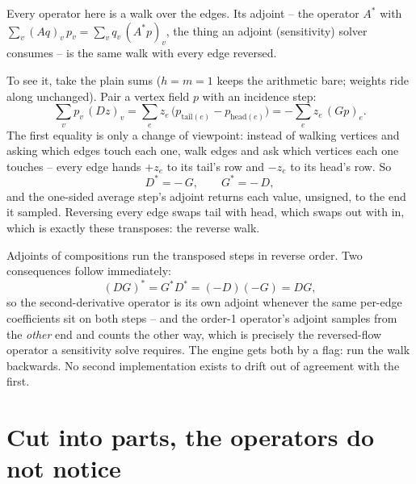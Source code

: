 \documentclass[11pt]{article}
\begin{document}
Every operator here is a walk over the edges. Its adjoint -- the
operator $A^{\!*}$ with
$\sum_v (Aq)_v\,p_v = \sum_v q_v\,(A^{\!*}p)_v$, the thing an
adjoint (sensitivity) solver consumes -- is the same walk with every
edge reversed.

\begin{center}
\end{center}

To see it, take the plain sums ($h = m = 1$ keeps the arithmetic
bare; weights ride along unchanged). Pair a vertex field $p$ with an
incidence step:
\[
\sum_v p_v\,(Dz)_v
 = \sum_e z_e\,\bigl(p_{\text{tail}(e)} - p_{\text{head}(e)}\bigr)
 = -\sum_e z_e\,(Gp)_e .
\]
The first equality is only a change of viewpoint: instead of walking
vertices and asking which edges touch each one, walk edges and ask
which vertices each one touches -- every edge hands $+z_e$ to its
tail's row and $-z_e$ to its head's row. So
\[
D^{\!*} = -\,G, \qquad G^{\!*} = -\,D,
\]
and the one-sided average step's adjoint returns each value, unsigned, to the
end it sampled. Reversing every edge swaps tail with head, which
swaps out with in, which is exactly these transposes: the reverse
walk.

Adjoints of compositions run the transposed steps in reverse order.
Two consequences follow immediately:
\[
(DG)^{\!*} = G^{\!*}D^{\!*} = (-D)(-G) = DG ,
\]
so the second-derivative operator is its own adjoint whenever the
same per-edge coefficients sit on both steps -- and the order-1
operator's adjoint samples from the \emph{other} end and counts the
other way, which is precisely the reversed-flow operator a
sensitivity solve requires. The engine gets both by a flag: run the
walk backwards. No second implementation exists to drift out of
agreement with the first.

\section{Cut into parts, the operators do not notice}
\label{sec:parts}
\end{document}
